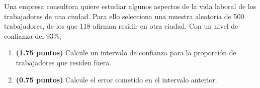 
Una empresa consultora quiere estudiar algunos aspectos de la vida laboral de los trabajadores de una ciudad. Para ello selecciona una muestra aleatoria de 500 trabajadores, de los que 118 afirman residir en otra ciudad. Con un nivel de confianza del $93\%$,
\begin{enumerate}[label=\alph*)]
\item \textbf{(1.75 puntos)} Calcule un intervalo de confianza para la proporción de trabajadores que residen fuera.
\item \textbf{(0.75 puntos)} Calcule el error cometido en el intervalo anterior.
\end{enumerate}
